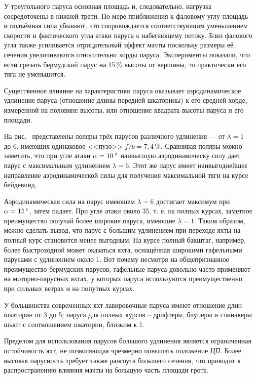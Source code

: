 У треугольного паруса основная площадь и,
следовательно, нагрузка сосредоточены в нижней трети. По мере
приближения к фаловому углу площадь и подъёмная сила убывают, что
сопровождается соответствующим уменьшением скорости и фактического
угла атаки паруса к набегающему потоку. Близ фалового угла также
усиливается отрицательный эффект мачты поскольку размеры её сечения
увеличиваются относительно хорды паруса. Эксперименты показали, что
если срезать бермудский парус на 15\,\% высоты от вершины, то
практически его тяга не уменьшится.

Существенное влияние на характеристики паруса оказывает
аэродинамическое удлинение паруса
(отношение длины передней шкаторины) к его средней хорде,
измеренной на половине высоты, или отношение квадрата высоты паруса и
его площади.

На рис.~ представлены поляры трёх парусов различного удлинения
--- от $\lambda = 1$ до 6, имеющих одинаковое <<пузо>>
$f/b=7,4\,\%$. Сравнивая поляры можно заметить, что при угле атаки
$\alpha = 10\,^\circ$ наивысшую аэродинамическу силу дает парус с
максимальным удлинением $\lambda = 6$. Этот же парус имеет
наивыгоднейшее направление аэродинамической силы для получения
максимальной тяги на курсе бейдевинд.

Аэродинамическая сила на парус имеющем $\lambda = 6$ достигает
максимум при $\alpha = 15\,^\circ$, затем падает. При угле атаки около
35\gr, т. е. на полных курсах, заметное преимущество получай более
широкие паруса, имеющие $\lambda = 1$. Таким образом, можно сделать
вывод, что парус с большим удлинением при переходе яхты на полный курс
становится менее выгодным. На курсе полный бакштаг, например, более
быстроходной может оказаться яхта, оснащённая широкими гафельными
парусами с удлинением около 1. Вот почему несмотря на общепризнанное
преимущество бермудских парусов, гафельные паруса довольно часто
применяют на моторно-парусных яхтах, у которых паруса используются
преимущественно при сильных ветрах и на попутных курсах.

У большинства современных яхт лавировочные паруса имеют отношение длин
шкаторин от 3 до 5; паруса для полных курсов \--- дрифтеры, блуперы и
спинакеры шьют с соотношением шкаторин, близким к 1.

Пределом для использования парусов большого удлинения является
ограниченная остойчивость яхт, не позволяющая чрезмерно повышать
положение \textit{ЦП}. Более высокая парусность требует также рангоута
большего сечения, что приводит к распространению влияния мачты на
большую часть площади грота.

